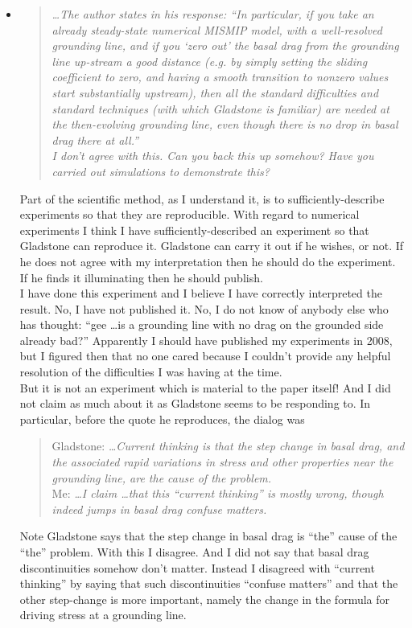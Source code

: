 \documentclass[11pt,reqno]{amsart}
\newcommand{\reply}[2]{
\medskip\medskip
\item  \begin{quote}
\emph{#1}
\end{quote}

\medskip
\noindent #2}
\begin{document}
\begin{itemize}
\reply{\dots The author states in his response: ``In particular, if you take an already steady-state numerical MISMIP model, with a well-resolved grounding line, and if you `zero out' the basal drag from the grounding line up-stream a good distance (e.g. by simply setting the sliding coefficient to zero, and having a smooth transition to nonzero values start substantially upstream), then all the standard difficulties and standard techniques (with which Gladstone is familiar) are needed at the then-evolving grounding line, even though there is no drop in basal drag there at all.'' \medskip \\
I don't agree with this. Can you back this up somehow? Have you carried out simulations to demonstrate this?}
{Part of the scientific method, as I understand it, is to sufficiently-describe experiments so that they are reproducible.  With regard to numerical experiments I think I have sufficiently-described an experiment so that Gladstone can reproduce it.  Gladstone can carry it out if he wishes, or not.  If he does not agree with my interpretation then he should do the experiment.  If he finds it illuminating then he should publish.\medskip \\
I have done this experiment and I believe I have correctly interpreted the result.  No, I have not published it.  No, I do not know of anybody else who has thought: ``gee \dots is a grounding line with no drag on the grounded side already bad?''  Apparently I should have published my experiments in 2008, but I figured then that no one cared because I couldn't provide any helpful resolution of the difficulties I was having at the time. \medskip \\
But it is not an experiment which is material to the paper itself!  And I did not claim as much about it as Gladstone seems to be responding to.  In particular, before the quote he reproduces, the dialog was \\
\begin{quote}
Gladstone: \emph{\dots Current thinking is that the step change in basal drag, and the associated rapid variations in stress and other properties near the grounding line, are the cause of the problem.} \medskip \\
Me: \emph{\dots  I claim \dots that this ``current thinking'' is mostly wrong, though indeed jumps in basal drag confuse matters.}
\end{quote}
\medskip
Note Gladstone says that the step change in basal drag is ``the'' cause of the ``the'' problem.  With this I disagree.  And I did not say that basal drag discontinuities somehow don't matter.  Instead I disagreed with ``current thinking'' by saying that such discontinuities ``confuse matters'' and that the other step-change is more important, namely the change in the formula for driving stress at a grounding line.}

\end{itemize}
\end{document}
